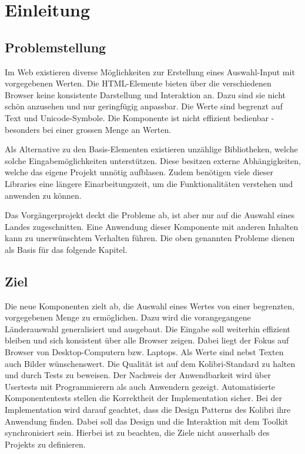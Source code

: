\chapter{Einleitung}


\section{Problemstellung}

Im Web existieren diverse Möglichkeiten zur Erstellung eines Auswahl-Input mit vorgegebenen Werten.
Die HTML-Elemente bieten über die verschiedenen Browser keine konsistente Darstellung und Interaktion an.
Dazu sind sie nicht schön anzusehen und nur geringfügig anpassbar. 
Die Werte sind begrenzt auf Text und Unicode-Symbole.
Die Komponente ist nicht effizient bedienbar - besonders bei einer grossen Menge an Werten.

Als Alternative zu den Basis-Elementen existieren unzählige Bibliotheken, welche solche Eingabemöglichkeiten unterstützen.
Diese besitzen externe Abhängigkeiten, welche das eigene Projekt unnötig aufblasen.
Zudem benötigen viele dieser Libraries eine längere Einarbeitungszeit, um die Funktionalitäten verstehen und anwenden zu können.

Das Vorgängerprojekt deckt die Probleme ab, ist aber nur auf die Auswahl eines Landes zugeschnitten.
Eine Anwendung dieser Komponente mit anderen Inhalten kann zu unerwünschtem Verhalten führen.
Die oben genannten Probleme dienen als Basis für das folgende Kapitel.


\section{Ziel}

Die neue Komponenten zielt ab, die Auswahl eines Wertes von einer begrenzten, vorgegebenen Menge zu ermöglichen.
Dazu wird die vorangegangene Länderauswahl generalisiert und ausgebaut.
Die Eingabe soll weiterhin effizient bleiben und sich konsistent über alle Browser zeigen.
Dabei liegt der Fokus auf Browser von Desktop-Computern bzw. Laptops.
Als Werte sind nebst Texten auch Bilder wünschenswert.
Die Qualität ist auf dem Kolibri-Standard zu halten und durch Tests zu beweisen.
Der Nachweis der Anwendbarkeit wird über Usertests mit Programmierern als auch Anwendern gezeigt.
Automatisierte Komponententests stellen die Korrektheit der Implementation sicher.
Bei der Implementation wird darauf geachtet, dass die Design Patterns des Kolibri ihre Anwendung finden.
Dabei soll das Design und die Interaktion mit dem Toolkit synchronisiert sein.
Hierbei ist zu beachten, die Ziele nicht ausserhalb des Projekts zu definieren.



